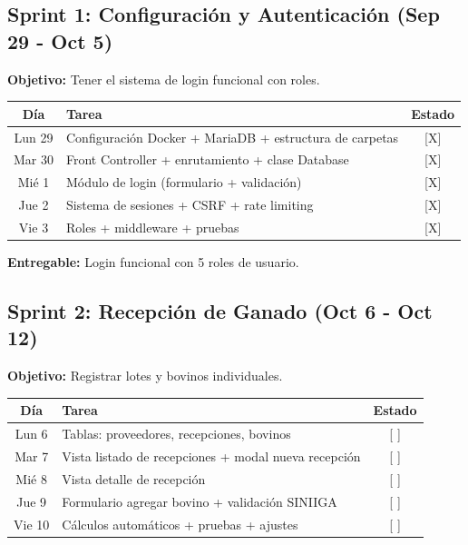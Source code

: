 \documentclass[11pt,a4paper]{article}
\begin{document}
\subsection*{Sprint 1: Configuración y Autenticación (Sep 29 - Oct 5)}

\textbf{Objetivo:} Tener el sistema de login funcional con roles.

\begin{center}
\begin{tabularx}{\textwidth}{|c|X|c|}
\hline
\rowcolor{verdeclaro}
\textbf{Día} & \textbf{Tarea} & \textbf{Estado} \\
\hline
Lun 29 & Configuración Docker + MariaDB + estructura de carpetas & [X] \\
\hline
Mar 30 & Front Controller + enrutamiento + clase Database & [X] \\
\hline
Mié 1 & Módulo de login (formulario + validación) & [X] \\
\hline
Jue 2 & Sistema de sesiones + CSRF + rate limiting & [X] \\
\hline
Vie 3 & Roles + middleware + pruebas & [X] \\
\hline
\end{tabularx}
\end{center}

\textbf{Entregable:} Login funcional con 5 roles de usuario.

\vspace{0.5cm}

\subsection*{Sprint 2: Recepción de Ganado (Oct 6 - Oct 12)}

\textbf{Objetivo:} Registrar lotes y bovinos individuales.

\begin{center}
\begin{tabularx}{\textwidth}{|c|X|c|}
\hline
\rowcolor{verdeclaro}
\textbf{Día} & \textbf{Tarea} & \textbf{Estado} \\
\hline
Lun 6 & Tablas: proveedores, recepciones, bovinos & [ ] \\
\hline
Mar 7 & Vista listado de recepciones + modal nueva recepción & [ ] \\
\hline
Mié 8 & Vista detalle de recepción & [ ] \\
\hline
Jue 9 & Formulario agregar bovino + validación SINIIGA & [ ] \\
\hline
Vie 10 & Cálculos automáticos + pruebas + ajustes & [ ] \\
\hline
\end{tabularx}
\end{center}
\end{document}
